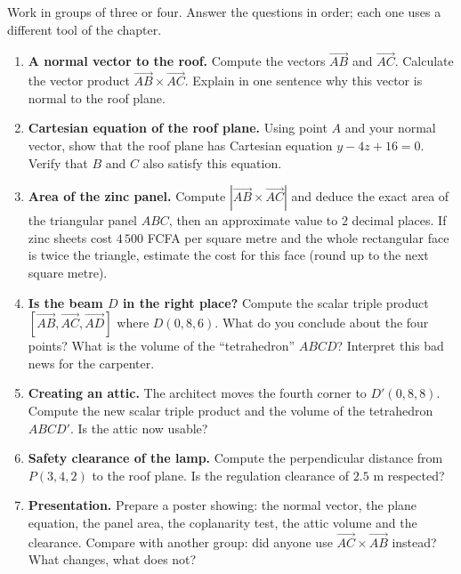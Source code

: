 \documentclass[11pt]{article}
\newcounter{popsec}
\newcounter{popsub}
\newcommand{\courssub}[1]{%
  \stepcounter{popsub}%
  \par\vspace{9pt}\noindent{\popxbold\fontsize{11.5}{13}\selectfont\color{popink}{\color{poporange}\thepopsec.\thepopsub}\hspace{6pt}#1}\par\nopagebreak\vspace{4pt}
}
\begin{document}
\courssub{Tasks}

Work in groups of three or four. Answer the questions in order; each one uses a different tool of the chapter.

\begin{enumerate}
\item \textbf{A normal vector to the roof.} Compute the vectors $\vec{AB}$ and $\vec{AC}$. Calculate the vector product $\vec{AB}\times\vec{AC}$. Explain in one sentence why this vector is normal to the roof plane.
\item \textbf{Cartesian equation of the roof plane.} Using point $A$ and your normal vector, show that the roof plane has Cartesian equation $y-4z+16=0$. Verify that $B$ and $C$ also satisfy this equation.
\item \textbf{Area of the zinc panel.} Compute $|\vec{AB}\times\vec{AC}|$ and deduce the exact area of the triangular panel $ABC$, then an approximate value to $2$ decimal places. If zinc sheets cost $4\,500$ FCFA per square metre and the whole rectangular face is twice the triangle, estimate the cost for this face (round up to the next square metre).
\item \textbf{Is the beam $D$ in the right place?} Compute the scalar triple product $[\vec{AB},\vec{AC},\vec{AD}]$ where $D(0,8,6)$. What do you conclude about the four points? What is the volume of the ``tetrahedron'' $ABCD$? Interpret this bad news for the carpenter.
\item \textbf{Creating an attic.} The architect moves the fourth corner to $D'(0,8,8)$. Compute the new scalar triple product and the volume of the tetrahedron $ABCD'$. Is the attic now usable?
\item \textbf{Safety clearance of the lamp.} Compute the perpendicular distance from $P(3,4,2)$ to the roof plane. Is the regulation clearance of $2.5$ m respected?
\item \textbf{Presentation.} Prepare a poster showing: the normal vector, the plane equation, the panel area, the coplanarity test, the attic volume and the clearance. Compare with another group: did anyone use $\vec{AC}\times\vec{AB}$ instead? What changes, what does not?
\end{enumerate}
\end{document}
